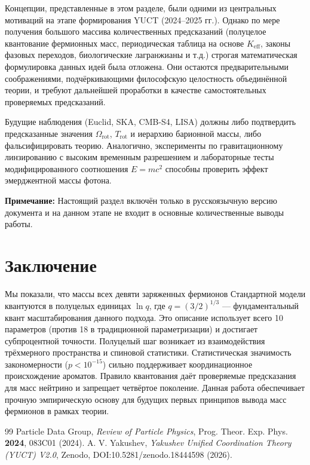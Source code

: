 \documentclass[12pt,a4paper]{article}
\begin{document}
Концепции, представленные в этом разделе, были одними из центральных мотиваций на этапе формирования YUCT (2024–2025 гг.). Однако по мере получения большого массива количественных предсказаний (полуцелое квантование фермионных масс, периодическая таблица на основе $K_{\mathrm{eff}}$, законы фазовых переходов, биологические лагранжианы и т.д.) строгая математическая формулировка данных идей была отложена. Они остаются предварительными соображениями, подчёркивающими философскую целостность объединённой теории, и требуют дальнейшей проработки в качестве самостоятельных проверяемых предсказаний.

Будущие наблюдения (Euclid, SKA, CMB-S4, LISA) должны либо подтвердить предсказанные значения $\Omega_{\mathrm{rot}}$, $T_{\mathrm{rot}}$ и иерархию барионной массы, либо фальсифицировать теорию. Аналогично, эксперименты по гравитационному линзированию с высоким временным разрешением и лабораторные тесты модифицированного соотношения $E=mc^2$ способны проверить эффект эмерджентной массы фотона.

\vspace{0.5cm}
\noindent\textbf{Примечание:} Настоящий раздел включён только в русскоязычную версию документа и на данном этапе не входит в основные количественные выводы работы.

	\section{Заключение}
	
	Мы показали, что массы всех девяти заряженных фермионов Стандартной модели квантуются в полуцелых единицах $\ln q$, где $q = (3/2)^{1/3}$ — фундаментальный квант масштабирования данного подхода. Это описание использует всего 10 параметров (против 18 в традиционной параметризации) и достигает субпроцентной точности. Полуцелый шаг возникает из взаимодействия трёхмерного пространства и спиновой статистики. Статистическая значимость закономерности ($p < 10^{-15}$) сильно поддерживает координационное происхождение ароматов. Правило квантования даёт проверяемые предсказания для масс нейтрино и запрещает четвёртое поколение. Данная работа обеспечивает прочную эмпирическую основу для будущих первых принципов вывода масс фермионов в рамках теории.
	
	\begin{thebibliography}{99}
		 Particle Data Group, \textit{Review of Particle Physics}, Prog. Theor. Exp. Phys. \textbf{2024}, 083C01 (2024).
		 A. V. Yakushev, \textit{Yakushev Unified Coordination Theory (YUCT) V2.0}, Zenodo, DOI:10.5281/zenodo.18444598 (2026).
	\end{thebibliography}
	
\end{document}
